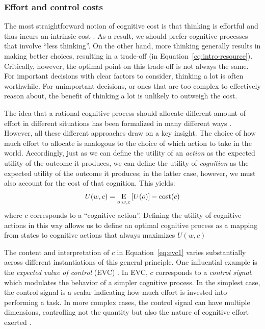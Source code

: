 \subsubsection{Effort and control costs}

The most straightforward notion of cognitive cost is that thinking is effortful and thus incurs an intrinsic cost \citep{shenhav2017rational}. As a result, we should prefer cognitive processes that involve ``less thinking''. On the other hand, more thinking generally results in making better choices, resulting in a trade-off (in Equation~\ref{eq:intro-resource}). Critically, however, the optimal point on this trade-off is not always the same. For important decisions with clear factors to consider, thinking a lot is often worthwhile. For unimportant decisions, or ones that are too complex to effectively reason about, the benefit of thinking a lot is unlikely to outweigh the cost.

The idea that a rational cognitive process should allocate different amount of effort in different situations has been formalized in many different ways \citep{shenhav2013expected,anderson1990adaptive,lieder2017strategy}. However, all these different approaches draw on a key insight. The choice of how much effort to allocate is analogous to the choice of which action to take in the world. Accordingly, just as we can define the utility of an \emph{action} as the expected utility of the outcome it produces, we can define the utility of \emph{cognition} as the expected utility of the outcome it produces; in the latter case, however, we must also account for the cost of that cognition. This yields:
\begin{equation}\label{eq:evc1}
  U(w, c) = 
    \operatorname*{E}_{o \mid w, c} \left[
      U(o)
    \right] - \text{cost}(c)
\end{equation}
where $c$ corresponds to a ``cognitive action''. Defining the utility of cognitive actions in this way allows us to define an optimal cognitive process as a mapping from states to cognitive actions that always maximizes $U(w,c)$




The content and interpretation of $c$ in Equation~\ref{eq:evc1} varies substantially across different instantiations of this general principle. One influential example is the \emph{expected value of control} (EVC) \citep{shenhav2013expected}. In EVC, $c$ corresponds to a \emph{control signal}, which modulates the behavior of a simpler cognitive process. In the simplest case, the control signal is a scalar indicating how much effort is invested into performing a task. In more complex cases, the control signal can have multiple dimensions, controlling not the quantity but also the nature of cognitive effort exerted \citep{musslick2015computational,grahek2020computational,ritz2021cognitive}.

